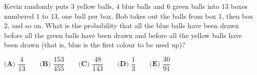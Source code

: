 Kevin randomly puts $3$ yellow balls, $4$ blue balls and $6$ green balls into $13$ boxes numbered $1$ to $13$, one ball per box. Bob takes out the balls from box $1$, then box $2$, and so on. What is the probability that all the blue balls have been drawn before all the green balls have been drawn and before all the yellow balls have been drawn (that is, blue is the first colour to be used up)?

$\textbf{(A) }\dfrac{4}{13}\qquad\textbf{(B) }\dfrac{153}{455}\qquad\textbf{(C) }\dfrac{48}{143}\qquad\textbf{(D) }\dfrac{1}{3}\qquad\textbf{(E) }\dfrac{30}{91}$
